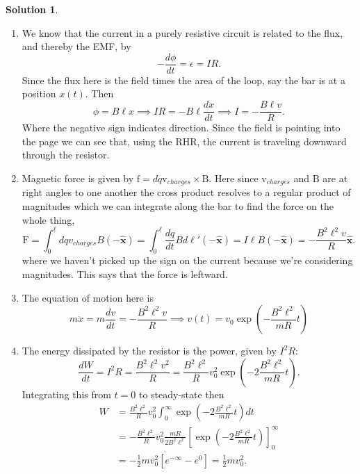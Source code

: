 \documentclass[10pt]{article}
\theoremstyle{definition}
\newtheorem{soln}{Solution}
\newcommand{\ux}{\hat{\mathbf{x}}}
\newcommand{\bv}[1]{\bm{\mathrm{#1}}}
\begin{document}
\begin{soln}~
  \begin{enumerate}[label=(\alph*)]
    \item We know that the current in a purely resistive circuit is related to the flux, and thereby the EMF, by
          $$-\frac{d\phi}{dt}=\epsilon=IR.$$
          Since the flux here is the field times the area of the loop, say the bar is at a position $x(t)$. Then
          $$\phi=B\ell x\implies IR=-B\ell\frac{dx}{dt}\implies I=-\frac{B\ell v}{R}.$$
          Where the negative sign indicates direction. Since the field is pointing into the page we can see that, using the
          RHR, the current is traveling downward through the resistor.
    \item Magnetic force is given by $\bv{f}=dq \bv{v}_{charges}\times \bv{B}$. Here since $\bv{v}_{charges}$ and $\bv{B}$ are at right
          angles to one another the cross product resolves to a regular product of magnitudes which we can integrate along the bar
          to find the force on the whole thing,
          $$\bv{F}=\int_{0}^{\ell}dq v_{charges} B(-\ux)=\int_{0}^{\ell}\frac{dq}{dt}Bd\ell'(-\ux)=I\ell B(-\ux)=-\frac{B^2\ell^2 v}{R}\ux.$$
          where we haven't picked up the sign on the current because we're considering magnitudes. This says that the force is leftward.
    \item The equation of motion here is
          $$m\ddot{x}=m\frac{dv}{dt}=-\frac{B^2\ell^2 v}{R}\implies v(t)=v_0\exp\left(-\frac{B^2\ell^2}{mR}t\right)$$
    \item The energy dissipated by the resistor is the power, given by $I^2R$:
          $$\frac{dW}{dt}=I^2 R=\frac{B^2\ell^2 v^2}{R}=\frac{B^2\ell^2}{R}v_0^2\exp\left(-2\frac{B^2\ell^2}{mR}t\right).$$
          Integrating this from $t=0$ to steady-state then
          \begin{align*}
            W & =\frac{B^2\ell^2}{R}v_0^2\int_0^\infty \exp\left(-2\frac{B^2\ell^2}{mR}t\right)dt                             \\
              & =-\frac{B^2\ell^2}{R}v_0^2\frac{mR}{2B^2\ell^2}\left[\exp\left(-2\frac{B^2\ell^2}{mR}t\right)\right]_0^\infty \\
              & =-\frac{1}{2}mv_0^2\left[e^{-\infty}-e^{0}\right]=\frac{1}{2}mv_0^2.
          \end{align*}
  \end{enumerate}
\end{soln}
\end{document}
